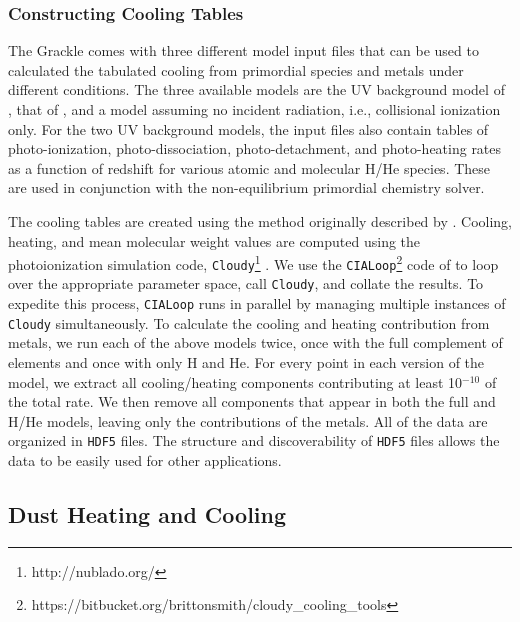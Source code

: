 \subsubsection{Constructing Cooling Tables} \label{sec:cooling-tables}

The Grackle comes with three different model input files that can be
used to calculated the tabulated cooling from primordial species and
metals under different conditions.  The three available models are the
UV background model of \citet{2009ApJ...703.1416F}, that of
\citet{2012ApJ...746..125H}, and a model assuming no incident
radiation, i.e., collisional ionization only.  For the two UV
background models, the input files also contain tables of
photo-ionization, photo-dissociation, photo-detachment, and
photo-heating rates as a function of redshift for various atomic and
molecular H/He species.  These are used in conjunction with the
non-equilibrium primordial chemistry solver.

The cooling tables are
created using the method originally described by
\citet{2008MNRAS.385.1443S}.  Cooling, heating, and mean molecular
weight values are computed using the photoionization simulation code, 
\texttt{Cloudy}\footnote{http://nublado.org/}
\citep{2013RMxAA..49..137F}.  We use the
\texttt{CIALoop}\footnote{https://bitbucket.org/brittonsmith/cloudy\_cooling\_tools}
code of \citet{2008MNRAS.385.1443S} to loop over the appropriate
parameter space, call \texttt{Cloudy}, and collate the results.  To
expedite this process, \texttt{CIALoop} runs in parallel by managing
multiple instances of \texttt{Cloudy} simultaneously.  To calculate
the cooling and heating contribution from metals, we run each of the
above models twice, once with the full complement of elements and once
with only H and He.  For every point in each version of the model, we
extract all cooling/heating components contributing at least
10$^{-10}$ of the total rate.  We then remove all components that
appear in both the full and H/He models, leaving only the
contributions of the metals.  All of the data are organized in
\texttt{HDF5} files.  The structure and discoverability of
\texttt{HDF5} files allows the data to be easily used for other
applications.


\subsection{Dust Heating and Cooling}

